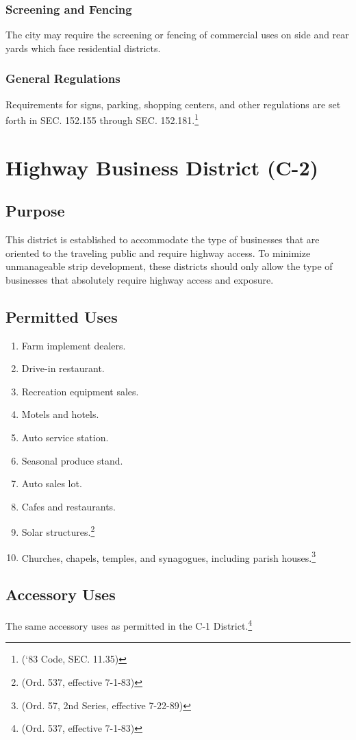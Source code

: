 \subsubsection{Screening and Fencing}
The city may require the screening or fencing of commercial uses on side and rear yards which face residential districts.
\subsubsection{General Regulations}
Requirements for signs, parking, shopping centers, and other regulations are set forth in SEC. 152.155 through SEC. 152.181.\footnote{(‘83 Code, SEC. 11.35)}
\section{Highway Business District (C-2)}
\subsection{Purpose}
This district is established to accommodate the type of businesses that are oriented to the traveling public and require highway access. To minimize unmanageable strip development, these districts should only allow the type of businesses that absolutely require highway access and exposure.
\subsection{Permitted Uses}
\begin{enumerate}[{\indent}1)]
    \item Farm implement dealers.
    \item Drive-in restaurant.
    \item Recreation equipment sales.
    \item Motels and hotels.
    \item Auto service station.
    \item Seasonal produce stand.
    \item Auto sales lot.
    \item Cafes and restaurants.
    \item Solar structures.\footnote{(Ord. 537, effective 7-1-83)}
    \item Churches, chapels, temples, and synagogues, including parish houses.\footnote{(Ord. 57, 2nd Series, effective 7-22-89)}
\end{enumerate}
\subsection{Accessory Uses}
The same accessory uses as permitted in the C-1 District.\footnote{(Ord. 537, effective 7-1-83)}
